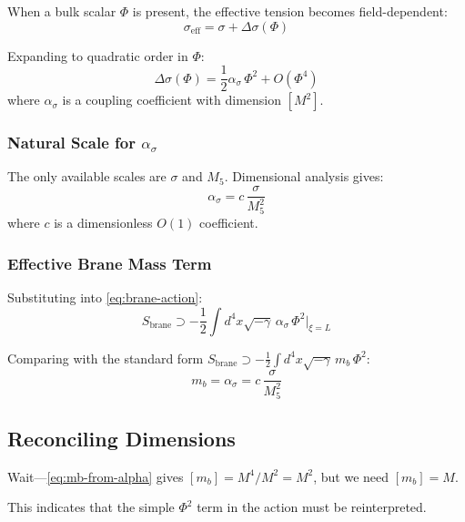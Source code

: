 \documentclass[11pt,a4paper]{article}
\newcommand{\Mfive}{M_5}
\newcommand{\mb}{m_b}
\theoremstyle{definition}
\theoremstyle{plain}
\theoremstyle{remark}
\begin{document}
When a bulk scalar $\Phi$ is present, the effective tension becomes field-dependent:
\begin{equation}
\sigma_{\mathrm{eff}} = \sigma + \Delta\sigma(\Phi)
\label{eq:effective-tension}
\end{equation}

Expanding to quadratic order in $\Phi$:
\begin{equation}
\Delta\sigma(\Phi) = \frac{1}{2}\alpha_\sigma \, \Phi^2 + O(\Phi^4)
\label{eq:delta-sigma}
\end{equation}
where $\alpha_\sigma$ is a coupling coefficient with dimension $[M^2]$.

\subsubsection{Natural Scale for $\alpha_\sigma$}

The only available scales are $\sigma$ and $\Mfive$. Dimensional analysis gives:
\begin{equation}
\alpha_\sigma = c \, \frac{\sigma}{\Mfive^2}
\label{eq:alpha-sigma}
\end{equation}
where $c$ is a dimensionless $O(1)$ coefficient.

\subsubsection{Effective Brane Mass Term}

Substituting into \cref{eq:brane-action}:
\begin{equation}
S_{\mathrm{brane}} \supset -\frac{1}{2}\int d^4x \sqrt{-\gamma} \, \alpha_\sigma \, \Phi^2\big|_{\xi=L}
\label{eq:effective-mass-term}
\end{equation}

Comparing with the standard form $S_{\mathrm{brane}} \supset -\frac{1}{2}\int d^4x \sqrt{-\gamma} \, \mb \, \Phi^2$:
\begin{equation}
\mb = \alpha_\sigma = c \, \frac{\sigma}{\Mfive^2}
\label{eq:mb-from-alpha}
\end{equation}

\subsection{Reconciling Dimensions}

Wait---\cref{eq:mb-from-alpha} gives $[\mb] = M^4/M^2 = M^2$, but we need $[\mb] = M$.

This indicates that the simple $\Phi^2$ term in the action must be reinterpreted.
\end{document}
